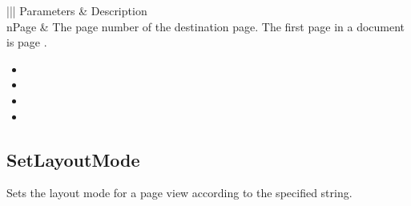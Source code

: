 \documentclass[letterpaper,12pt,english,openany,oneside]{sphinxmanual}
\begin{document}
\begin{savenotes}\sphinxattablestart
\centering
{}\label{\detokenize{IAC_API_OLE_Objects:section-100}}\nobreak
\begin{tabular}[t]{|||}
\hline
\sphinxstyletheadfamily 
Parameters
&\sphinxstyletheadfamily 
Description
\\
\hline
nPage
&
The page number of the destination page. The first page in a document is page .
\\
\hline
\end{tabular}
\par
\sphinxattableend\end{savenotes}
\label{\detokenize{IAC_API_OLE_Objects:related-methods-146}}
\begin{itemize}
\item {} 
 

\item {} 
 

\item {} 
 

\item {} 
 

\end{itemize}




\subsection{SetLayoutMode}
\label{\detokenize{IAC_API_OLE_Objects:setlayoutmode}}
Sets the layout mode for a page view according to the specified string.


\begin{sphinxVerbatim}[commandchars=\\\{\}]
  
\end{sphinxVerbatim}
\label{\detokenize{IAC_API_OLE_Objects:parameters-86}}
\end{document}
